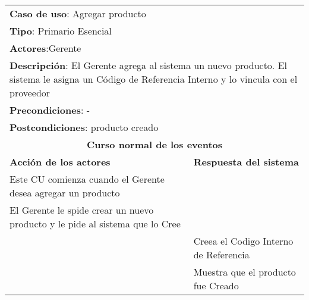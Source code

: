 \begin{longtable}{ |p{8cm}|p{8cm}| }
		\hline
		\multicolumn{2}{|p{16cm}|}{\textbf{Caso de uso}: Agregar producto}\\
		\multicolumn{2}{|p{16cm}|}{\textbf{Tipo}: Primario Esencial}\\
		\multicolumn{2}{|p{16cm}|}{\textbf{Actores}:Gerente }\\
		\multicolumn{2}{|p{16cm}|}{\textbf{Descripción}: El Gerente agrega al sistema un nuevo producto. El sistema le asigna un Código de Referencia Interno y lo vincula con el proveedor}\\
		\multicolumn{2}{|p{16cm}|}{\textbf{Precondiciones}: -}\\
		\multicolumn{2}{|p{16cm}|}{\textbf{Postcondiciones}: producto creado}\\
		\hline
		\multicolumn{2}{|c|}{\textbf{Curso normal de los eventos}}\\
		\hline
		\textbf{Acción de los actores} & \textbf{Respuesta del sistema}\\
		\hline
			\inc Este CU comienza cuando el Gerente desea agregar un producto & \\
			\hline
			\inc El Gerente le spide crear un nuevo producto y le pide al sistema que lo Cree &   \\
			\hline
			& \inc Creea el Codigo Interno de Referencia  \\
			\hline
			& \inc Muestra que el producto fue Creado  \\
			\hline



\end{longtable}
